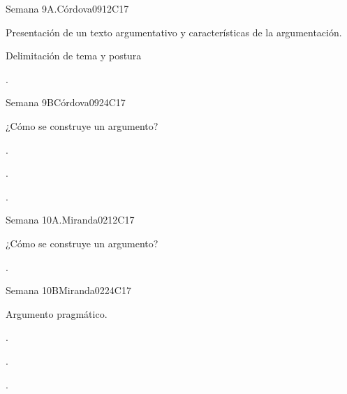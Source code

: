 \begin{syllabus}
\begin{unit}{Semana 9A.}{}{Córdova09}{12}{C17}
   \begin{topics}
      \item Presentación de un texto argumentativo y características de la argumentación.
      \item Delimitación de tema y postura

   \end{topics}
   \begin{learningoutcomes}
      \item . 
   \end{learningoutcomes}
\end{unit}

\begin{unit}{Semana 9B}{}{Córdova09}{24}{C17}
   \begin{topics}
      \item ¿Cómo se construye un argumento?
   \end{topics}

   \begin{learningoutcomes}
      \item . 
      \item .
      \item . 
      \end{learningoutcomes}
\end{unit}

\begin{unit}{Semana 10A.}{}{Miranda02}{12}{C17}
   \begin{topics}
      \item ¿Cómo se construye un argumento?
   \end{topics}
   \begin{learningoutcomes}
      \item . 
   \end{learningoutcomes}
\end{unit}

\begin{unit}{Semana 10B}{}{Miranda02}{24}{C17}
   \begin{topics}
      \item  Argumento pragmático.
   \end{topics}

   \begin{learningoutcomes}
      \item . 
      \item .
      \item . 
      \end{learningoutcomes}
\end{unit}


\end{syllabus}
